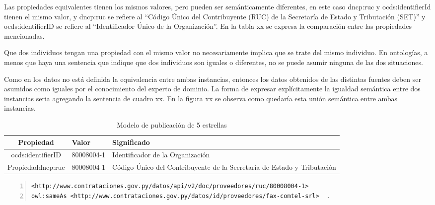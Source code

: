  Las propiedades equivalentes tienen los mismos valores, pero pueden ser semánticamente diferentes, en este caso dncp:ruc y ocds:identifierId tienen el mismo valor, y dncp:ruc se refiere al “Código Único del Contribuyente (RUC) de la Secretaría de Estado y Tributación (SET)” y ocds:identifierID se refiere al “Identificador Único de la Organización”. En la tabla xx se expresa la comparación entre las propiedades mencionadas.

 Que dos individuos tengan una propiedad con el mismo valor no necesariamente implica que se trate del mismo individuo. En ontologías, a menos que haya una sentencia que indique que dos individuos son iguales o diferentes, no se puede asumir ninguna de las dos situaciones. 

 Como en los datos no está definida la equivalencia entre ambas instancias, entonces los datos obtenidos de las distintas fuentes deben ser asumidos como iguales por el conocimiento del experto de dominio. La forma de expresar explícitamente la igualdad semántica entre dos instancias seria agregando la sentencia de cuadro xx. En la figura xx se observa como quedaría esta unión semántica entre ambas instancias.
 


 \begin{table}[]
    \centering
    \caption{Modelo de publicación de 5 estrellas}
    \label{modelo-5-estrellas}
    \resizebox{15cm}{!} {
    \begin{tabular}{|c|l|l|}
    \hline
    
Propiedad & Valor &  Significado \\ \hline

ocds:identifierID  & 80008004-1 &  Identificador de la Organización \\ \hline
Propiedaddncp:ruc & 80008004-1 &  Código Único del Contribuyente de la Secretaría de Estado y Tributación \\ \hline

    \end{tabular}
    }
    \end{table}



    \begin{lstlisting}[captionpos=b, caption=Información referente al proceso licitatorio cuyo identificacor es, label=lst:caso1,  numbers=left,  numberstyle=\tiny\color{mygray},
        basicstyle=\tiny,frame=single]
<http://www.contrataciones.gov.py/datos/api/v2/doc/proveedores/ruc/80008004-1> 
owl:sameAs <http://www.contrataciones.gov.py/datos/id/proveedores/fax-comtel-srl>  .

     \end{lstlisting}

